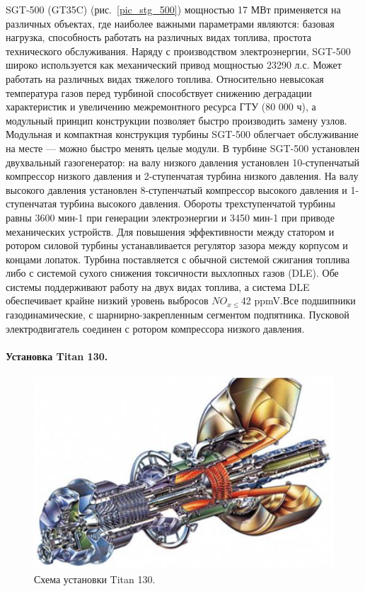 \documentclass[a4paper,12pt]{article}
\begin{document}
    SGT-500 (GT35C) (рис.~\ref{pic_stg_500}) мощностью 17 МВт применяется на различных объектах, где наиболее важными параметрами
    являются: базовая нагрузка, способность работать на различных видах  топлива, простота технического
    обслуживания.
    Наряду с производством  электроэнергии, SGT-500 широко используется как механический
    привод  мощностью 23290 л.с. Может работать на различных видах тяжелого топлива.
    Относительно невысокая температура газов перед турбиной способствует снижению деградации характеристик и
    увеличению межремонтного ресурса ГТУ (80 000 ч), а модульный принцип конструкции позволяет
    быстро производить замену узлов.
    Модульная и компактная конструкция турбины SGT-500 облегчает обслуживание на месте — можно быстро менять целые модули.
    В турбине SGT-500 установлен двухвальный газогенератор: на валу низкого давления установлен
    10-ступенчатый компрессор низкого давления и 2-ступенчатая турбина низкого давления.
    На валу высокого давления установлен 8-ступенчатый компрессор высокого давления и
    1-ступенчатая турбина высокого давления.
    Обороты трехступенчатой турбины равны 3600 мин-1 при генерации электроэнергии и 3450 мин-1 при
    приводе механических устройств.
    Для повышения эффективности между статором и ротором
    силовой турбины устанавливается регулятор зазора между корпусом и концами лопаток.
    Турбина поставляется с обычной системой сжигания топлива либо с системой сухого снижения
    токсичности выхлопных газов (DLE).
    Обе системы поддерживают работу на двух видах топлива, а система DLE обеспечивает крайне низкий
    уровень выбросов $NO_{x\leq}$42 ppmV.Все подшипники газодинамические,
    с шарнирно-закрепленным сегментом подпятника.
    Пусковой электродвигатель соединен с ротором компрессора низкого давления.~\cite{sgt-500}

    \paragraph{Установка Titan 130.}

    \begin{figure}[h!]
        \centering
        \includegraphics[scale=1.0]{./pictures/Titan_130.png}
        \caption{Схема установки Titan 130.}
        \label{pic_titan130}
    \end{figure}
\end{document}
